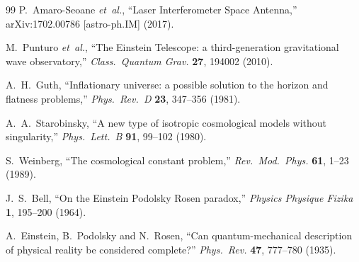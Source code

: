 \documentclass[dvipdfmx,11pt,a4paper]{article}
\begin{document}
\begin{thebibliography}{99}
P.~Amaro-Seoane \textit{et~al.},
``Laser Interferometer Space Antenna,''
arXiv:1702.00786 [astro-ph.IM] (2017).

M.~Punturo \textit{et~al.},
``The Einstein Telescope: a third-generation gravitational wave observatory,''
\textit{Class.\ Quantum Grav.} \textbf{27}, 194002 (2010).

A.~H.~Guth,
``Inflationary universe: a possible solution to the horizon and flatness problems,''
\textit{Phys.\ Rev.\ D} \textbf{23}, 347--356 (1981).

A.~A.~Starobinsky,
``A new type of isotropic cosmological models without singularity,''
\textit{Phys.\ Lett.\ B} \textbf{91}, 99--102 (1980).

S.~Weinberg,
``The cosmological constant problem,''
\textit{Rev.\ Mod.\ Phys.} \textbf{61}, 1--23 (1989).

J.~S.~Bell,
``On the Einstein Podolsky Rosen paradox,''
\textit{Physics Physique Fizika} \textbf{1}, 195--200 (1964).

A.~Einstein, B.~Podolsky and N.~Rosen,
``Can quantum-mechanical description of physical reality be considered complete?''
\textit{Phys.\ Rev.} \textbf{47}, 777--780 (1935).

\end{thebibliography}
\end{document}
